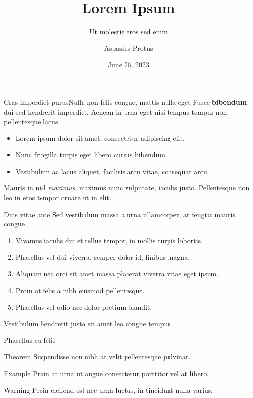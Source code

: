 \title{Lorem Ipsum}
\subtitle{Ut molestie eros sed enim}
\author{Aspasius Protus}
\date{June 26, 2023} 

\frame{\maketitle} 

\begin{frame}{Cras imperdiet purus}{Nulla non felis congue, mattis nulla eget}
  Fusce \textbf{bibendum} dui sed hendrerit imperdiet.
  Aenean in urna eget nisi tempus tempus non pellentesque lacus.
  \begin{itemize}
    \item Lorem ipsum dolor sit amet, consectetur adipiscing elit.
    \item Nunc fringilla turpis eget libero cursus bibendum.
    \item Vestibulum ac lacus aliquet, facilisis arcu vitae, consequat arcu.
  \end{itemize}
  Mauris in nisl \textit{maximus}, maximus nunc vulputate, iaculis justo.
  Pellentesque non leo in eros tempor ornare ut in elit.
\end{frame}

\begin{frame}{Duis vitae ante}
  Sed \alert{vestibulum} massa a urna ullamcorper, at feugiat mauris congue.
  \begin{enumerate}
    \item Vivamus iaculis dui et tellus tempor, in mollis turpis lobortis.
    \item Phasellus vel dui viverra, semper dolor id, finibus magna.
    \item Aliquam nec orci sit amet massa placerat viverra vitae eget ipsum.
    \item Proin at felis a nibh euismod pellentesque.
    \item Phasellus vel odio nec dolor pretium blandit.
  \end{enumerate}
  Vestibulum hendrerit justo sit amet leo congue tempus.
\end{frame}

\begin{frame}{Phasellus eu felis}
  
  \begin{block}{Theorem}
    Suspendisse non nibh at velit pellentesque pulvinar.
  \end{block}

  \begin{exampleblock}{Example}
    Proin at urna ut augue consectetur porttitor vel at libero.
  \end{exampleblock}

  \begin{alertblock}{Warning}
    Proin eleifend est nec urna luctus, in tincidunt nulla varius.
  \end{alertblock}
\end{frame}

